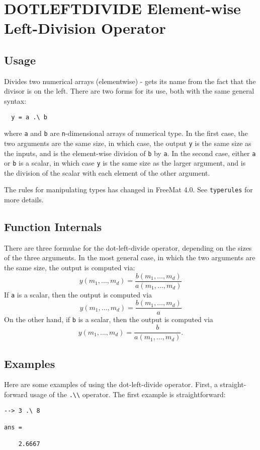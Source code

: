 \section{DOTLEFTDIVIDE Element-wise Left-Division Operator}

\subsection{Usage}

Divides two numerical arrays (elementwise) - gets its name from the 
fact that the divisor is on the left.  There are two forms
for its use, both with the same general syntax:
\begin{verbatim}
  y = a .\ b
\end{verbatim}
where \verb|a| and \verb|b| are \verb|n|-dimensional arrays of numerical type.  In the
first case, the two arguments are the same size, in which case, the 
output \verb|y| is the same size as the inputs, and is the element-wise
division of \verb|b| by \verb|a|.  In the second case, either \verb|a| or \verb|b| is a scalar, 
in which case \verb|y| is the same size as the larger argument,
and is the division of the scalar with each element of the other argument.

The rules for manipulating types has changed in FreeMat 4.0.  See \verb|typerules|
for more details.

\subsection{Function Internals}

There are three formulae for the dot-left-divide operator, depending on the
sizes of the three arguments.  In the most general case, in which 
the two arguments are the same size, the output is computed via:
\[
y(m_1,\ldots,m_d) = \frac{b(m_1,\ldots,m_d)}{a(m_1,\ldots,m_d)}
\]
If \verb|a| is a scalar, then the output is computed via
\[
y(m_1,\ldots,m_d) = \frac{b(m_1,\ldots,m_d)}{a}
\]
On the other hand, if \verb|b| is a scalar, then the output is computed via
\[
y(m_1,\ldots,m_d) = \frac{b}{a(m_1,\ldots,m_d)}.
\]
\subsection{Examples}

Here are some examples of using the dot-left-divide operator.  First, a 
straight-forward usage of the \verb|.\\| operator.  The first example
is straightforward:
\begin{verbatim}
--> 3 .\ 8

ans = 

    2.6667 
\end{verbatim}

